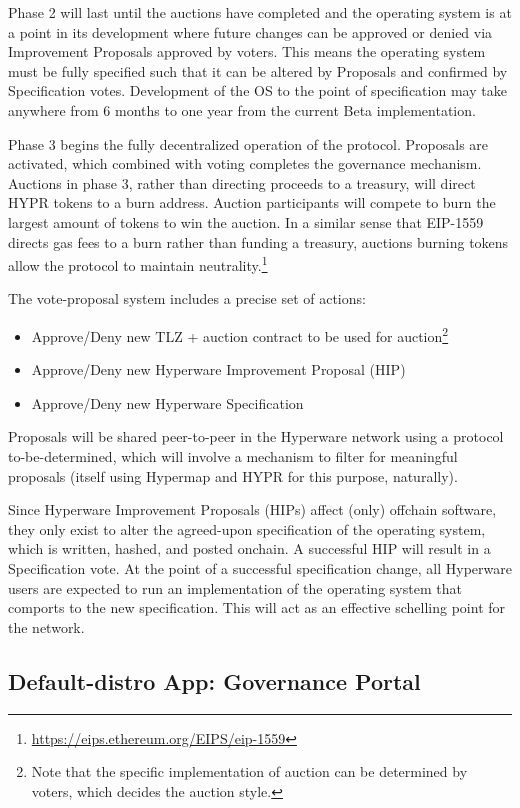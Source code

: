 \documentclass[runningheads]{llncs}
\begin{document}
Phase 2 will last until the auctions have completed and the operating system is at a point in its development where future changes can be approved or denied via Improvement Proposals approved by voters.
This means the operating system must be fully specified such that it can be altered by Proposals and confirmed by Specification votes.
Development of the OS to the point of specification may take anywhere from 6 months to one year from the current Beta implementation.

Phase 3 begins the fully decentralized operation of the protocol.
Proposals are activated, which combined with voting completes the governance mechanism.
Auctions in phase 3, rather than directing proceeds to a treasury, will direct HYPR tokens to a burn address.
Auction participants will compete to burn the largest amount of tokens to win the auction.
In a similar sense that EIP-1559 directs gas fees to a burn rather than funding a treasury, auctions burning tokens allow the protocol to maintain neutrality.\footnote{\url{https://eips.ethereum.org/EIPS/eip-1559}}

The vote-proposal system includes a precise set of actions:
\begin{itemize}
    \item Approve/Deny new TLZ + auction contract to be used for auction\footnote{Note that the specific implementation of auction can be determined by voters, which decides the auction style.}
    \item Approve/Deny new Hyperware Improvement Proposal (HIP)
    \item Approve/Deny new Hyperware Specification
\end{itemize}

Proposals will be shared peer-to-peer in the Hyperware network using a protocol to-be-determined, which will involve a mechanism to filter for meaningful proposals (itself using Hypermap and HYPR for this purpose, naturally).

Since Hyperware Improvement Proposals (HIPs) affect (only) offchain software, they only exist to alter the agreed-upon specification of the operating system, which is written, hashed, and posted onchain.
A successful HIP will result in a Specification vote.
At the point of a successful specification change, all Hyperware users are expected to run an implementation of the operating system that comports to the new specification.
This will act as an effective schelling point for the network.

\subsection{Default-distro App: Governance Portal}
\label{sec:govportal}
\end{document}
